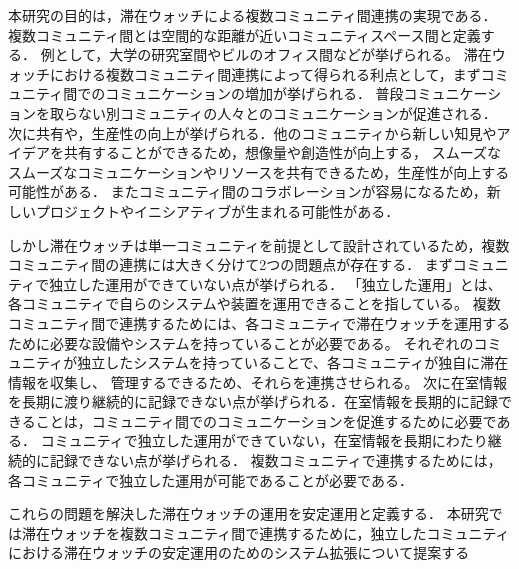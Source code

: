 本研究の目的は，滞在ウォッチによる複数コミュニティ間連携の実現である．
複数コミュニティ間とは空間的な距離が近いコミュニティスペース間と定義する．
例として，大学の研究室間やビルのオフィス間などが挙げられる。
滞在ウォッチにおける複数コミュニティ間連携によって得られる利点として，まずコミュニティ間でのコミュニケーションの増加が挙げられる．
普段コミュニケーションを取らない別コミュニティの人々とのコミュニケーションが促進される．
次に共有や，生産性の向上が挙げられる．他のコミュニティから新しい知見やアイデアを共有することができるため，想像量や創造性が向上する，
スムーズなスムーズなコミュニケーションやリソースを共有できるため，生産性が向上する可能性がある．
またコミュニティ間のコラボレーションが容易になるため，新しいプロジェクトやイニシアティブが生まれる可能性がある．

しかし滞在ウォッチは単一コミュニティを前提として設計されているため，複数コミュニティ間の連携には大きく分けて2つの問題点が存在する．
まずコミュニティで独立した運用ができていない点が挙げられる．
「独立した運用」とは、各コミュニティで自らのシステムや装置を運用できることを指している。
複数コミュニティ間で連携するためには、各コミュニティで滞在ウォッチを運用するために必要な設備やシステムを持っていることが必要である。
それぞれのコミュニティが独立したシステムを持っていることで、各コミュニティが独自に滞在情報を収集し、
管理するできるため、それらを連携させられる。
次に在室情報を長期に渡り継続的に記録できない点が挙げられる．在室情報を長期的に記録できることは，コミュニティ間でのコミュニケーションを促進するために必要である．
コミュニティで独立した運用ができていない，在室情報を長期にわたり継続的に記録できない点が挙げられる．
複数コミュニティで連携するためには，各コミュニティで独立した運用が可能であることが必要である．


これらの問題を解決した滞在ウォッチの運用を安定運用と定義する．
本研究では滞在ウォッチを複数コミュニティ間で連携するために，独立したコミュニティにおける滞在ウォッチの安定運用のためのシステム拡張について提案する
